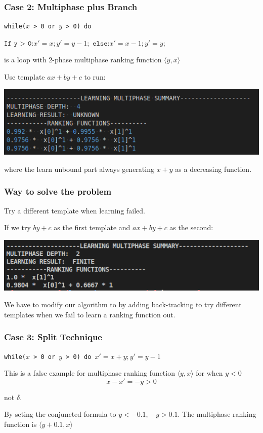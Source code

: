 \documentclass[10pt]{beamer}
\begin{document}
\begin{frame}\frametitle{Case 2: Multiphase plus Branch}
\begin{example}
\texttt{while($x$ > 0 or $y$ > 0) do }

$\texttt{If y > 0:} x' = x; y' = y - 1;$
$\texttt{else:} x' = x - 1; y' = y;$


\end{example}

is a loop with 2-phase multiphase ranking function $\langle y, x\rangle$

Use template $ax + by + c$ to run:
\begin{center}
\includegraphics[scale= 0.5]{2.png}
\end{center}
where the learn unbound part always generating $x + y$ as a decreasing function.

\end{frame}

\begin{frame}\frametitle{Way to solve the problem}
Try a different template when learning failed.

If we try $by + c$ as the first template and $ax + by + c$ as the second:

\begin{center}

\includegraphics[scale= 0.5]{3.png}
\end{center}

We have to modify our algorithm to by adding back-tracking to try different templates when we fail to learn a ranking function out. 
\end{frame}

\begin{frame}\frametitle{Case 3: Split Technique}
\begin{example}
\texttt{while($x$ > 0 or $y$ > 0) do }$x' = x + y; y' = y - 1$

This is a false example for multiphase ranking function $\langle y,x\rangle$ for when $y < 0$ 
\[ x - x' = -y > 0\]

not $\delta$.



\end{example}

By seting the conjuncted formula to $ y < -0.1$,
 $-y > 0.1$. The multiphase ranking function is $\langle y+0.1, x\rangle$


\end{frame}
\end{document}
